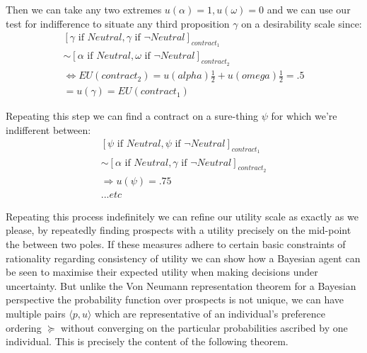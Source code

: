 \documentclass{tufte-handout}
\begin{document}
\noindent Then we can take any two extremes $u(\alpha) = 1, u(\omega) = 0$ and we can use our test for indifference to situate any third proposition $\gamma$ on a desirability scale since: 
\begin{equation} 
\begin{split}
 [\gamma \text{ if } Neutral, \gamma \text{ if } \neg Neutral]_{contract_1} \\ 
 \sim   [\alpha \text{ if } Neutral, \omega \text{ if } \neg Neutral ]_{contract_2} \\
 \Leftrightarrow EU(contract_{2}) = u(alpha)\frac{1}{2}  + u(omega)\frac{1}{2} = .5  \\ = u(\gamma) = EU(contract_{1})
\end{split}
\end{equation}

Repeating this step we can find a contract on a sure-thing $\psi$ for which we're indifferent between:
\begin{equation} 
\begin{split}
[\psi \text{ if } Neutral, \psi \text{ if } \neg Neutral]_{contract_1}  \\
 \sim   [\alpha \text{ if } Neutral, \gamma \text{ if } \neg Neutral ]_{contract_2} \\
  \Rightarrow u(\psi) = .75
   \\ . . . etc
 \end{split}
\end{equation}


Repeating this process indefinitely we can refine our utility scale as exactly as we please, by repeatedly finding prospects with a utility precisely  on the mid-point the between two poles. If these measures adhere to certain basic constraints of rationality regarding consistency of utility we can show how a Bayesian agent can be seen to maximise their expected utility when making decisions under uncertainty. But unlike the Von Neumann representation theorem for a Bayesian perspective the probability function over prospects is not unique, we can have multiple pairs $\langle p, u \rangle$ which are representative of an individual's preference ordering $\succeq$ without converging on the particular probabilities ascribed by one individual. This is precisely the content of the following theorem. 
\end{document}
